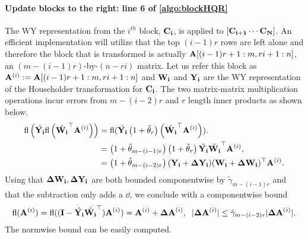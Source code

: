 \paragraph{Update blocks to the right: line 6 of \cref{algo:blockHQR}}
The WY representation from the $i^{th}$ block, $\mathbf{C_i}$, is applied to $[\mathbf{C_{i+1}} \cdots \mathbf{C_N}]$.
An efficient implementation will utilize that the top $(i-1)r$ rows are left alone and therefore the block that is transformed is actually $\mathbf{A}[(i-1)r+1:m, ri+1:n]$, an  $(m-(i-1)r)$-by-$(n-ri)$ matrix. 
Let us refer this block as $\mathbf{A}^{(i)}:=\mathbf{A}[(i-1)r+1:m, ri+1:n]$ and $\mathbf{W_i}$ and $\mathbf{Y_i}$ are the WY representation of the Householder transformation for $\mathbf{C_i}$.
The two matrix-matrix multiplication operations incur errors from $m-(i-2)r$ and $r$ length inner products as shown below.
\begin{align*}
	\mathrm{fl}\left(\hat{\mathbf{Y_i}} \mathrm{fl}\left(\hat{\mathbf{W_i}}^{\top}\mathbf{A}^{(i)}\right)\right) &= \mathrm{fl}(\hat{\mathbf{Y_i}} \left(1+\tilde{\theta}_{r}\right)\left(\hat{\mathbf{W_i}}^{\top}\mathbf{A}^{(i)}\right)). \\
	&= \left(1+\tilde{\theta}_{m-(i-1)r}\right)\left(1+\tilde{\theta}_{r}\right)\hat{\mathbf{Y_i}}\hat{\mathbf{W_i}}^{\top}\mathbf{A}^{(i)},\\
	&= \left(1+\tilde{\theta}_{m-(i-2)r}\right)(\mathbf{Y_i} + \mathbf{\Delta Y_i})(\mathbf{W_i} + \mathbf{\Delta W_i})^{\top}\mathbf{A}^{(i)}.
\end{align*}
Using that $\mathbf{\Delta W_i}, \mathbf{\Delta Y_i}$ are both bounded componentwise by $\tilde{\gamma}_{m-(i-1)r}$ and that the subtraction only adds a $\dd$, we conclude with a componentwise bound
\begin{equation}
	\mathrm{fl}(\mathbf{A}^{(i)}) = \mathrm{fl}((\mathbf{I}-\hat{\mathbf{Y_i}}\hat{\mathbf{W_i}}^{\top})\mathbf{A}^{(i)}) = \mathbf{A}^{(i)} +\mathbf{\Delta A}^{(i)}, \;\; |\mathbf{\Delta A}^{(i)}|\leq \tilde{\gamma}_{m-(i-2)r} |\mathbf{\Delta A}^{(i)}|.
\end{equation}
The normwise bound can be easily computed. 

